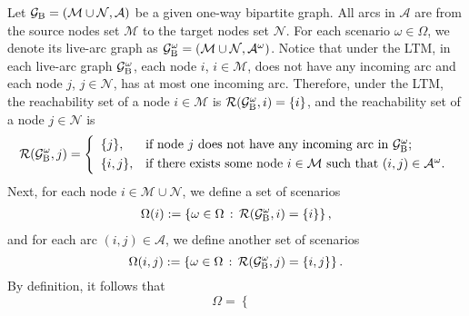 \documentclass[a4paper,10pt]{article}
\newcommand{\G}{\mathcal{G}}
\theoremstyle{plain}
\newcommand{\revv}[1]{{#1}}
\begin{document}
{		Let $\mathcal{G}_{\rm{B}}=(\mathcal{M}\cup \mathcal{N},\mathcal{A})$ be a given one-way bipartite graph.
		All arcs in $\mathcal{A}$ are from the source nodes set $\mathcal{M}$ to the target nodes set $\mathcal{N}$.
		For each scenario $\omega\in\Omega$, we denote its live-arc graph as $\mathcal{G}_{\rm{B}}^{\omega}=(\mathcal{M}\cup \mathcal{N},\mathcal{A}^{\omega})$. 
		Notice that under the LTM, in each live-arc graph $\mathcal{G}_{\rm{B}}^\omega$, each node $i$, $i \in \mathcal{M}$, does not have any incoming arc and each node $j$, $j \in \mathcal{N}$, has at most one incoming arc.
		Therefore, under the LTM, the reachability set of a node $i\in \mathcal{M}$ is $\mathcal{R}(\mathcal{G}_{\rm{B}}^\omega, i) = \{i\}$, and the reachability set of a node $j\in \mathcal{N}$ is
		\begin{equation}\label{obg_property}
			\begin{aligned}
				\mathcal{R}(\mathcal{G}_{\rm{B}}^{\omega},j) =\left\{
				\begin{array}{ll}
					\{j\},& {\text{if node}}~j~\text{does not have any incoming arc in $\G_{\rm{B}}^{\omega}$};\\[3pt]
					\{i,j\},& {\text{if there exists some node}}~i\in \mathcal{M}~\text{such that}~(i,j)\in\mathcal{A}^{\omega}.\\
				\end{array}\right.
			\end{aligned}
		\end{equation}
		Next, for each node $i \in \mathcal{M} 
		\cup \mathcal{N}$, we define a set of scenarios
		\begin{equation}
			\begin{aligned}
				& \Omega(i):=
				\left\{\omega\in\Omega \,:\, \mathcal{R}(\mathcal{G}_{\rm{B}}^{\omega},i)=\{i\}\right\},\\
			\end{aligned}
		\end{equation}
		and for each arc $(i,j) \in \mathcal{A}$, we define another set of scenarios 
		\begin{equation}
			\Omega(i,j):=\left\{\omega\in\Omega\,:\,\mathcal{R}(\mathcal{G}_{\rm{B}}^{\omega},j)=\{i,j\}\right\}.
		\end{equation}
		By definition, it follows that
		\revv{
			\begin{equation}
				\label{omegarelation}
				\Omega=\left\{
				\begin{aligned}

\end{aligned}
\end{equation}}}
\end{document}
